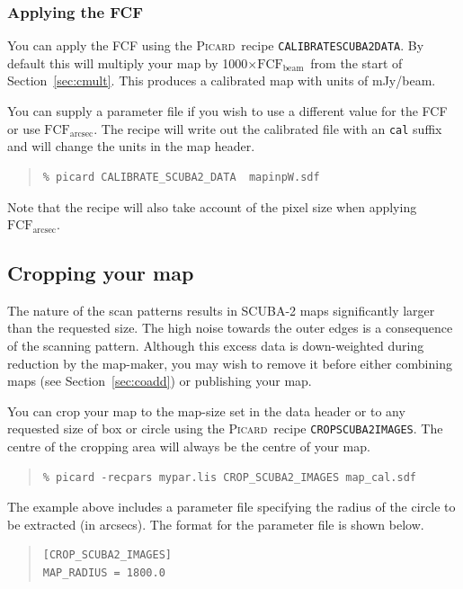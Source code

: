 \documentclass[twoside,11pt]{article}
\newcommand{\htmlref}[2]{#1}
\newcommand{\latexhtml}[2]{#1}
\newcommand{\xref}[3]{#1}
\newcommand{\xlabel}[1]{}
\renewcommand{\_}{\texttt{\symbol{95}}}
\newenvironment{myquote}{\begin{quote}\begin{small}}{\end{small}\end{quote}}
\newcommand{\fcfb}{$\mathrm{FCF_{beam}}$}
\newcommand{\fcfa}{$\mathrm{FCF_{arcsec}}$}
\newcommand{\picard}{\xref{\textsc{Picard}}{sun265}{}}
\newcommand{\drrecipe}[1]{\texttt{#1}}
\newcommand{\cref}[3]{\latexhtml{#1~\ref{#2}}{\htmlref{#3}{#2}}}
\begin{document}
\subsubsection{Applying the FCF}

You can apply the FCF using the \picard\ recipe
\xref{\drrecipe{CALIBRATE\_SCUBA2\_DATA}}{sun265}{CALIBRATE\_SCUBA2\_DATA}.
By default this will multiply your map by
1000$\times$\fcfb\ from the start of
\cref{Section}{sec:cmult}{Flux Conversion Factors}. This produces a
calibrated map with units of mJy/beam.

You can supply a parameter file if you wish to use a different value
for the FCF or use \fcfa. The recipe will write out the calibrated
file with an \texttt{\_cal} suffix and will change the units in the
map header.

\begin{myquote}
\begin{verbatim}
% picard CALIBRATE_SCUBA2_DATA  mapinpW.sdf
\end{verbatim}
\end{myquote}
Note that the recipe will also take account of the pixel size when
applying \fcfa.


\subsection{\xlabel{crop}Cropping your map}
\label{sec:crop}

The nature of the scan patterns results in SCUBA-2 maps significantly
larger than the requested size. The high noise towards the outer edges
is a consequence of the scanning pattern. Although this excess data is
down-weighted during reduction by the map-maker, you may wish to remove
it before either combining maps (see
\cref{Section}{sec:coadd}{Co-adding multiple maps}) or publishing your
map.

You can crop your map to the map-size set in the data header or
to any requested size of box or circle using the \picard\ recipe
\xref{\drrecipe{CROP\_SCUBA2\_IMAGES}}{sun265}{CROP\_SCUBA2\_IMAGES}.
The centre of the cropping area will always be the centre of your map.
\begin{myquote}
\begin{verbatim}
% picard -recpars mypar.lis CROP_SCUBA2_IMAGES map_cal.sdf
\end{verbatim}
\end{myquote}
The example above includes a parameter file specifying the radius of
the circle to be extracted (in arcsecs).  The format for the parameter
file is shown below.
\begin{center}
\begin{myquote}
\begin{verbatim}
[CROP_SCUBA2_IMAGES]
MAP_RADIUS = 1800.0
\end{verbatim}
\end{myquote}
\end{center}
\end{document}
